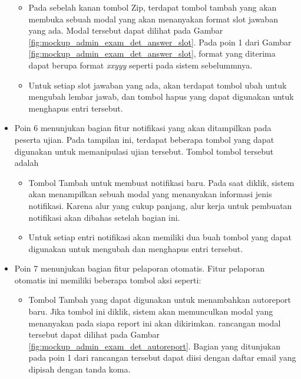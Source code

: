 \begin{itemize}
\begin{itemize}
                \item Pada sebelah kanan tombol Zip, terdapat tombol tambah yang
                    akan membuka sebuah modal yang akan menanyakan format slot
                    jawaban yang ada. Modal tersebut dapat dilihat pada Gambar
                    \ref{fig:mockup_admin_exam_det_answer_slot}. Pada poin 1
                    dari Gambar \ref{fig:mockup_admin_exam_det_answer_slot},
                    format yang diterima dapat berupa format \textit{xxyyy}
                    seperti pada sistem sebelummnya.
                    
                \item Untuk setiap slot jawaban yang ada, akan terdapat tombol
                    ubah untuk mengubah lembar jawab, dan tombol hapus yang
                    dapat digunakan untuk menghapus entri tersebut.
            \end{itemize}
            
        \item Poin 6 menunjukan bagian fitur notifikasi yang akan ditampilkan
            pada peserta ujian. Pada tampilan ini, terdapat beberapa tombol yang
            dapat digunakan untuk memanipulasi ujian tersebut. Tombol tombol
            tersebut adalah
                \begin{itemize}
                    \item Tombol Tambah untuk membuat notifikasi baru. Pada saat
                        diklik, sistem akan menampilkan sebuah modal yang
                        menanyakan informasi jenis notifikasi. Karena alur yang
                        cukup panjang, alur kerja untuk pembuatan notifikasi
                        akan dibahas setelah bagian ini.
                        
                    \item Untuk setiap entri notifikasi akan memiliki dua buah
                        tombol yang dapat digunakan untuk mengubah dan menghapus
                        entri tersebut.
                \end{itemize}
            
        \item Poin 7 menunjukan bagian fitur pelaporan otomatis. Fitur pelaporan
            otomatis ini memiliki beberapa tombol aksi seperti:
           \begin{itemize}
               \item Tombol Tambah yang dapat digunakan untuk menambahkan
                    autoreport baru. Jika tombol ini diklik, sistem akan
                    memunculkan modal yang menanyakan pada siapa report ini akan
                    dikirimkan. rancangan modal tersebut dapat dilihat pada
                    Gambar \ref{fig:mockup_admin_exam_det_autoreport}. Bagian
                    yang ditunjukan pada poin 1 dari rancangan tersebut dapat
                    diisi dengan daftar email yang dipisah dengan tanda koma.
                    

\end{itemize}
\end{itemize}
